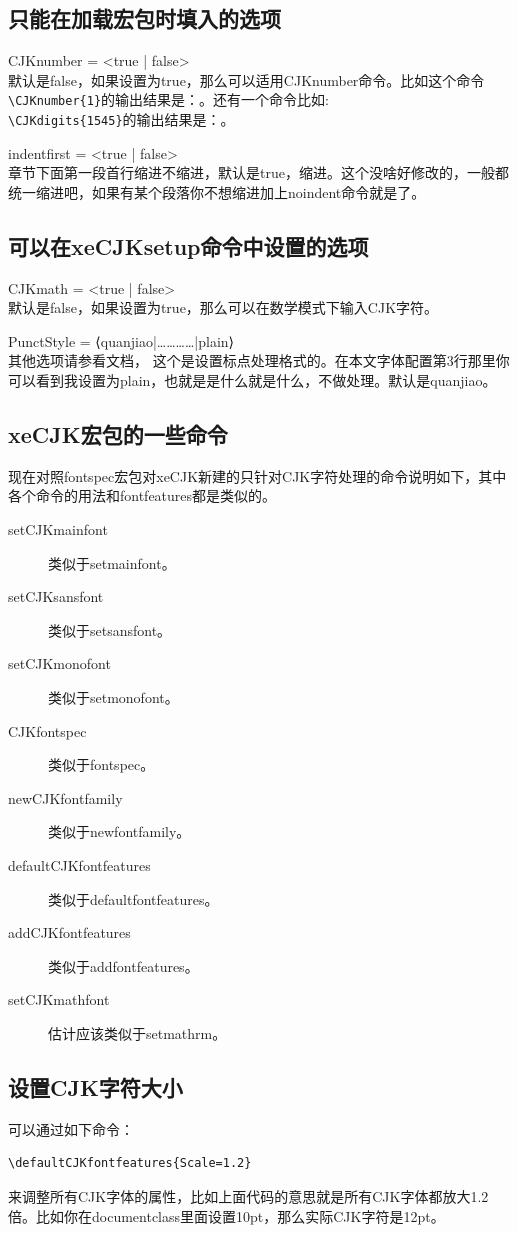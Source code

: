 \documentclass[11pt,oneside]{book}
\begin{document}
\subsection{只能在加载宏包时填入的选项}
CJKnumber = <true | false> \\
默认是false，如果设置为true，那么可以适用CJKnumber命令。比如这个命令\verb+\CJKnumber{1}+的输出结果是：。还有一个命令比如:\\
\verb+\CJKdigits{1545}+的输出结果是：。

indentfirst = <true | false>\\
章节下面第一段首行缩进不缩进，默认是true，缩进。这个没啥好修改的，一般都统一缩进吧，如果有某个段落你不想缩进加上noindent命令就是了。

\subsection{可以在xeCJKsetup命令中设置的选项}
CJKmath = <true | false>\\
默认是false，如果设置为true，那么可以在数学模式下输入CJK字符。

PunctStyle = {⟨quanjiao|…………|plain⟩}\\
其他选项请参看文档， 这个是设置标点处理格式的。在本文字体配置第3行那里你可以看到我设置为plain，也就是是什么就是什么，不做处理。默认是quanjiao。

\subsection{xeCJK宏包的一些命令}
现在对照fontspec宏包对xeCJK新建的只针对CJK字符处理的命令说明如下，其中各个命令的用法和fontfeatures都是类似的。
\begin{description}
\item[setCJKmainfont] 类似于setmainfont。
\item[setCJKsansfont] 类似于setsansfont。
\item[setCJKmonofont] 类似于setmonofont。
\item[CJKfontspec] 类似于fontspec。
\item[newCJKfontfamily] 类似于newfontfamily。
\item[defaultCJKfontfeatures] 类似于defaultfontfeatures。
\item[addCJKfontfeatures] 类似于addfontfeatures。
\item[setCJKmathfont] 估计应该类似于setmathrm。
\end{description}

\subsection{设置CJK字符大小}
可以通过如下命令：
\begin{Verbatim}
\defaultCJKfontfeatures{Scale=1.2}   
\end{Verbatim}
来调整所有CJK字体的属性，比如上面代码的意思就是所有CJK字体都放大1.2倍。比如你在documentclass里面设置10pt，那么实际CJK字符是12pt。
\end{document}

